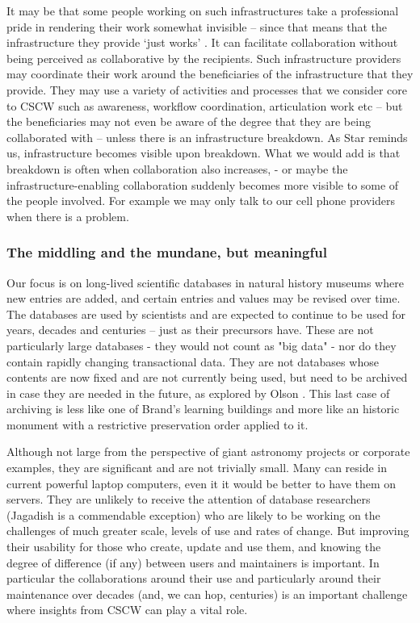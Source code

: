 It may be that some people working on such infrastructures take a professional pride in rendering their work somewhat invisible – since that means that the infrastructure they provide ‘just works’ . It can facilitate collaboration without being perceived as collaborative by the recipients. Such infrastructure providers may coordinate their work around the beneficiaries of the infrastructure that they provide. They may use a variety of activities and processes that we consider core to CSCW such as awareness, workflow coordination, articulation work etc – but the beneficiaries may not even be aware of the degree that they are being collaborated with – unless there is an infrastructure breakdown. As Star reminds us, infrastructure becomes visible upon breakdown. What we would add is that breakdown is often when collaboration also increases, - or maybe the infrastructure-enabling collaboration suddenly becomes more visible to some of the people involved. For example we may only talk to our cell phone providers when there is a problem.

\subsubsection{The middling and the mundane, but meaningful}

Our focus is on long-lived scientific databases in natural history museums where new entries are added, and certain entries and values may be revised over time. The databases are used by scientists and are expected to continue to be used for years, decades and centuries – just as their precursors have. These are not particularly large databases - they would not count as "big data" - nor do they contain rapidly changing transactional data. They are not databases whose contents are now fixed and are not currently being used, but need to be archived in case they are  needed in the future, as explored by Olson \cite{olson2010database}. This last case of archiving is less like one of Brand’s learning buildings and more like an historic monument with a restrictive preservation order applied to it.

Although not large from the perspective of giant astronomy projects or corporate examples, they are  significant and are not trivially small. Many can reside in current powerful laptop computers, even it it would be better to have them on servers. They are unlikely to receive the attention of database researchers (Jagadish is a commendable exception) who are likely to be working on the challenges of much greater scale, levels of use and rates of change. But improving their usability for those who create, update and use them, and knowing the degree of difference (if any) between users and maintainers is important. In particular the collaborations around their use and particularly around their maintenance over decades (and, we can hop, centuries) is an important challenge where insights from CSCW can play a vital role.

